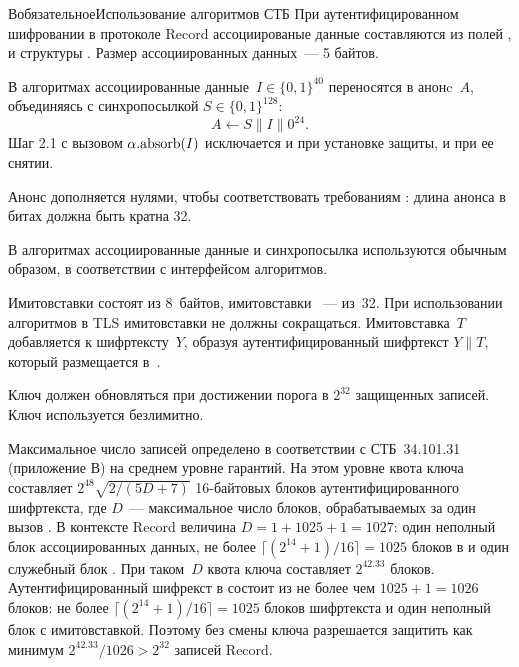 \begin{appendix}{В}{обязательное}{Использование алгоритмов СТБ}
При аутентифицированном шифровании в протоколе Record ассоциированые 
данные составляются из полей , 
 и  структуры 
. Размер ассоциированных данных~--- 5 байтов.

В алгоритмах  ассоциированные данные~$I\in\{0,1\}^{40}$ 
переносятся в анонc~$A$, объединяясь с синхропосылкой $S\in\{0,1\}^{128}$:
$$
A\gets S\parallel I\parallel 0^{24}.
$$
Шаг 2.1 с вызовом $\alpha.\code{absorb}(I)$ исключается и при установке защиты, 
и при ее снятии.

\begin{note}
Анонс дополняется нулями, чтобы соответствовать требованиям 
: длина анонса в битах должна быть кратна 32.
\end{note}

В алгоритмах  ассоциированные данные и синхропосылка 
используются обычным образом, в соответствии с интерфейсом алгоритмов.

Имитовставки  состоят из 8~байтов, имитовставки 
~--- из~32. При использовании алгоритмов в TLS
имитовставки не должны сокращаться. Имитовставка~$T$ добавляется к 
шифртексту~$Y$, образуя аутентифицированный шифртекст $Y\parallel T$,
который размещается в~.

Ключ  должен обновляться при достижении порога в $2^{32}$ 
защищенных записей. Ключ  используется безлимитно.

\begin{note}
Максимальное число записей  определено в соответствии с 
СТБ~34.101.31 (приложение В) на среднем уровне гарантий. 
%
На этом уровне квота ключа составляет $2^{48}\sqrt{2/(5D+7)}$ 16-байтовых блоков
аутентифицированного шифртекста, где $D$~--- максимальное число блоков, 
обрабатываемых за один вызов . 
%
В контексте Record величина $D=1+1025+1=1027$: 
один неполный блок ассоциированных данных, не более 
$\lceil(2^{14}+1)/16\rceil=1025$ блоков в  и один 
служебный блок .
%
При таком~$D$ квота ключа составляет $2^{42.33}$ блоков.
%
Аутентифицированный шифрекст в 
состоит из не более чем $1025+1=1026$ блоков: не более 
$\lceil(2^{14}+1)/16\rceil=1025$ блоков шифртекста и один неполный блок с 
имитовставкой.
%
Поэтому без смены ключа разрешается защитить как минимум 
$2^{42.33}/1026>2^{32}$ записей Record.
\end{note}


\end{appendix}
